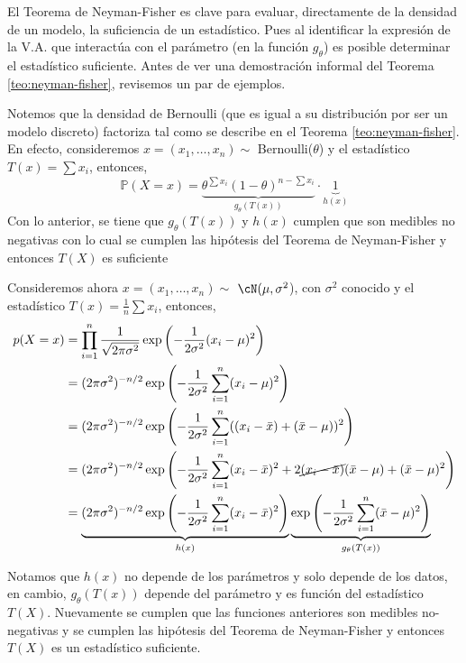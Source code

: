 El Teorema de Neyman-Fisher es clave para evaluar, directamente de la densidad de un modelo, la suficiencia de un estadístico. Pues al identificar la expresión de la V.A. que interactúa con el parámetro (en la función $g_\theta$) es posible determinar el estadístico suficiente. Antes de ver una demostración informal del Teorema \ref{teo:neyman-fisher}, revisemos un par de ejemplos.

\begin{example}
	Notemos que la densidad de Bernoulli (que es igual a su distribución por ser un modelo discreto) factoriza tal como se describe en el Teorema \ref{teo:neyman-fisher}. En efecto, consideremos $x=(x_1,\ldots, x_n)\sim$ Bernoulli($\theta$) y el estadístico $T(x) = \sum x_i$, entonces, 
	\begin{equation}
		\mathbb{P}(X=x) = \underbrace{\theta^{\sum x_i}(1-\theta)^{n-\sum x_i}}_{g_\theta(T(x))} \cdot \underbrace{1}_{h(x)}
	\end{equation}
	Con lo anterior, se tiene que $g_\theta(T(x))$ y $h(x)$ cumplen que son medibles no negativas con lo cual se cumplen las hipótesis del Teorema de Neyman-Fisher y entonces $T(X)$ es suficiente
\end{example}

\begin{example}
	Consideremos ahora $x=(x_1,\ldots, x_n)\sim$ $\cN(\mu,\sigma^2$), con $\sigma^2$ conocido y el estadístico $T(x) = \frac{1}{n}\sum x_i$, entonces, 
	\begin{align*}
		p(X=x) & = \prod_{i=1}^n \frac{1}{\sqrt{2\pi\sigma^2}}\exp\left(-\frac{1}{2\sigma^2}(x_i-\mu)^2\right)\\
		&=  (2\pi\sigma^2)^{-n/2}\exp\left(-\frac{1}{2\sigma^2}\sum_{i=1}^n(x_i-\mu)^2\right)\\
		&=  (2\pi\sigma^2)^{-n/2}\exp\left(-\frac{1}{2\sigma^2}\sum_{i=1}^n((x_i-\bar{x}) + (\bar{x}-\mu))^2\right)\\
		&=  (2\pi\sigma^2)^{-n/2}\exp\left(-\frac{1}{2\sigma^2}\sum_{i=1}^n (x_i-\bar{x})^2 + 2\cancel{(x_i-\bar{x})}(\bar{x}-\mu) + (\bar{x}-\mu)^2\right)\\
		&=  \underbrace{(2\pi\sigma^2)^{-n/2}\exp\left(-\frac{1}{2\sigma^2}\sum_{i=1}^n (x_i-\bar{x})^2\right)}_{h(x)} \underbrace{\exp\left( -\frac{1}{2\sigma^2}\sum_{i=1}^n (\bar{x}-\mu)^2\right)}_{g_\theta(T(x))}
	\end{align*}
	
	Notamos que $h(x)$ no depende de los parámetros y solo depende de los datos, en cambio, $g_\theta(T(x))$ depende del parámetro y es función del estadístico $T(X)$. Nuevamente se cumplen que las funciones anteriores son medibles no-negativas y se cumplen las hipótesis del Teorema de Neyman-Fisher y entonces $T(X)$ es un estadístico suficiente.
\end{example}

